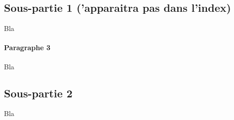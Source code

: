 \iffalse
\subsection*{Sous-partie 1 ('apparaitra pas dans l'index)} Bla



\paragraph*{Paragraphe 3} Bla

\newpage

\subsection*{Sous-partie 2}

Bla

